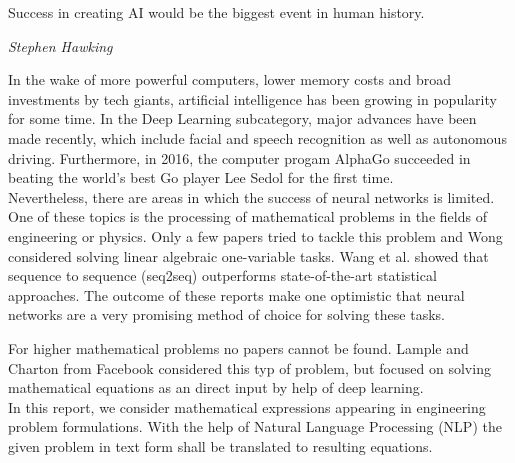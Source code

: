 \epigraph{Success in creating AI would be the biggest event in human history.}{\textit{Stephen Hawking}}

In the wake of more powerful computers, lower memory costs and broad investments by tech giants, artificial intelligence has been growing in popularity for some time.  In the Deep Learning subcategory, major advances have been made recently, which include facial and speech recognition as well as autonomous driving. Furthermore, in 2016, the computer progam AlphaGo succeeded in beating the world's best Go player Lee Sedol for the first time.\\

Nevertheless, there are areas in which the success of neural networks is limited. One of these topics is the processing of mathematical problems in the fields of engineering or physics. Only a few papers tried to tackle this problem \parencite{wang2017deep} and Wong considered solving linear algebraic one-variable tasks. Wang et al. showed that sequence to sequence (seq2seq) outperforms state-of-the-art statistical approaches. The outcome of these reports make one optimistic that neural networks are a very promising method of choice for solving these tasks. 

For higher mathematical problems no papers cannot be found. Lample and Charton from Facebook considered this typ of problem, but focused on solving mathematical equations as an direct input by help of deep learning. \\

In this report, we consider mathematical expressions appearing in engineering problem formulations. With the help of Natural Language Processing (NLP) the given problem in text form shall be translated to resulting equations.